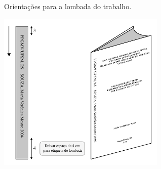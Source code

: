 \documentclass[oneside,openright,12pt]{ufsm_2021} %
\begin{document}
        \begin{grafico}[ht]
     	    \caption{\label{exepretex2}Orientações para a lombada do trabalho.}
	    \centering
	    \includegraphics[width=0.6\textwidth]{figuras/lombada.png}
         \end{grafico}         
         
         \lipsum[2-10]

      
         
\end{document}
